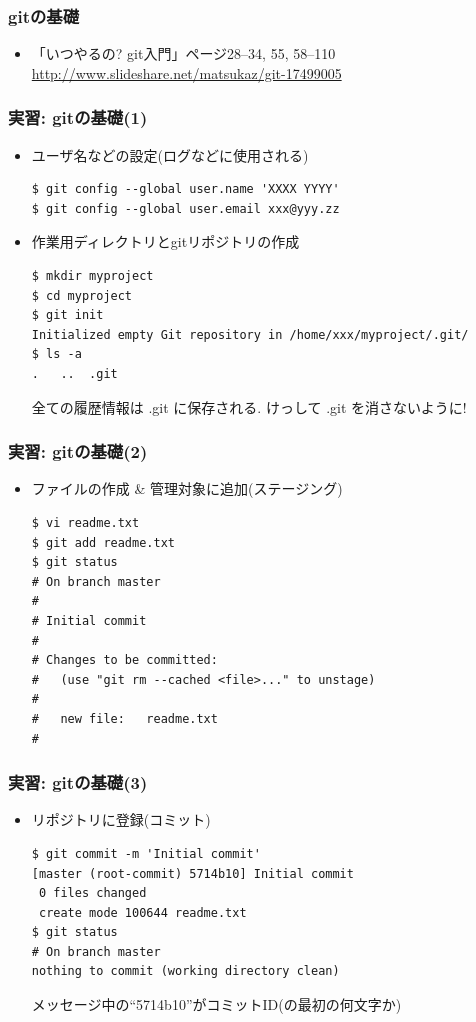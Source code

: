 \begin{frame}
  \frametitle{gitの基礎}
  \begin{itemize}
  \item 「いつやるの? git入門」ページ28--34, 55, 58--110 \\
    \url{http://www.slideshare.net/matsukaz/git-17499005}
  \end{itemize}
\end{frame}

\begin{frame}[t,fragile]
  \frametitle{実習: gitの基礎(1)}
  \begin{itemize}
  \item ユーザ名などの設定(ログなどに使用される)
\begin{lstlisting}
$ git config --global user.name 'XXXX YYYY'
$ git config --global user.email xxx@yyy.zz
\end{lstlisting}
  \item 作業用ディレクトリとgitリポジトリの作成
\begin{lstlisting}
$ mkdir myproject
$ cd myproject
$ git init
Initialized empty Git repository in /home/xxx/myproject/.git/
$ ls -a
.	..	.git
\end{lstlisting}
  全ての履歴情報は .git に保存される. けっして .git を消さないように!
  \end{itemize}
\end{frame}

\begin{frame}[t,fragile]
  \frametitle{実習: gitの基礎(2)}
  \begin{itemize}
  \item ファイルの作成 \& 管理対象に追加(ステージング)
\begin{lstlisting}
$ vi readme.txt
$ git add readme.txt
$ git status
# On branch master
#
# Initial commit
#
# Changes to be committed:
#   (use "git rm --cached <file>..." to unstage)
#
#	new file:   readme.txt
#
\end{lstlisting}
  \end{itemize}
\end{frame}

\begin{frame}[t,fragile]
  \frametitle{実習: gitの基礎(3)}
  \begin{itemize}
  \item リポジトリに登録(コミット)
\begin{lstlisting}
$ git commit -m 'Initial commit'
[master (root-commit) 5714b10] Initial commit
 0 files changed
 create mode 100644 readme.txt
$ git status
# On branch master
nothing to commit (working directory clean)
\end{lstlisting}
  メッセージ中の``5714b10''がコミットID(の最初の何文字か)
  \end{itemize}
\end{frame}

